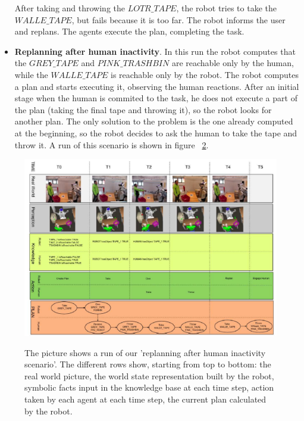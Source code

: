 \begin{itemize}
\begin{figure}
{      }
  \label{fig:case_study-helper-scenario3}
\end{figure}


After taking and throwing the $LOTR\_TAPE$, the robot tries to take the
$WALLE\_TAPE$, but fails because it is too far. The robot informs the user
and replans. The agents execute the plan, completing the task.

\item
\textbf{Replanning after human inactivity}.
In this run the robot computes that the $GREY\_TAPE$ and $PINK\_TRASHBIN$
are reachable only by the human, while the $WALLE\_TAPE$ is reachable only by the robot. The robot computes a plan
and starts executing it, observing the human reactions. 
 After an initial stage when the human is
commited to the task, he does not execute a part of the plan (taking
the final tape and throwing it), so the robot looks for another
plan. The only solution to the problem is the one already computed at
the beginning, so the robot decides to ask
 the human to take the tape and throw it. A run of this
scenario is shown in figure ~\ref{fig:case_study-helper-experiment}. 
\end{itemize}

 
\begin{figure}
  \caption{The picture shows a run of our 'replanning after human
    inactivity scenario'. The different
    rows show, starting from top to bottom: the real world picture,
    the world state representation built by the robot, symbolic facts
    input in the knowledge base at each time step, action taken by each
    agent at each time step, the current plan calculated by the robot.}
  \centering
  \includegraphics[angle=90, scale=0.7]{img/case_study/helper/plan.pdf}
  \label{fig:case_study-helper-experiment}

\end {figure}


